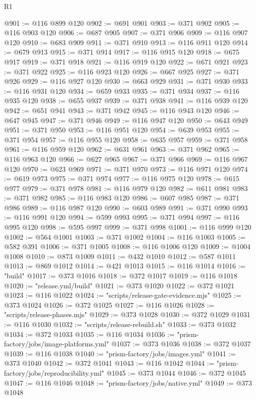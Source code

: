 \begin{lexlean}{R1}
\begin{coremodule}
@901 := @116 @899 @120
@902 := @691 @901
@903 := @371 @902
@905 := @116 @903 @120
@906 := @687 @905
@907 := @371 @906
@909 := @116 @907 @120
@910 := @683 @909
@911 := @371 @910
@913 := @116 @911 @120
@914 := @679 @913
@915 := @371 @914
@917 := @116 @915 @120
@918 := @675 @917
@919 := @371 @918
@921 := @116 @919 @120
@922 := @671 @921
@923 := @371 @922
@925 := @116 @923 @120
@926 := @667 @925
@927 := @371 @926
@929 := @116 @927 @120
@930 := @663 @929
@931 := @371 @930
@933 := @116 @931 @120
@934 := @659 @933
@935 := @371 @934
@937 := @116 @935 @120
@938 := @655 @937
@939 := @371 @938
@941 := @116 @939 @120
@942 := @651 @941
@943 := @371 @942
@945 := @116 @943 @120
@946 := @647 @945
@947 := @371 @946
@949 := @116 @947 @120
@950 := @643 @949
@951 := @371 @950
@953 := @116 @951 @120
@954 := @639 @953
@955 := @371 @954
@957 := @116 @955 @120
@958 := @635 @957
@959 := @371 @958
@961 := @116 @959 @120
@962 := @631 @961
@963 := @371 @962
@965 := @116 @963 @120
@966 := @627 @965
@967 := @371 @966
@969 := @116 @967 @120
@970 := @623 @969
@971 := @371 @970
@973 := @116 @971 @120
@974 := @619 @973
@975 := @371 @974
@977 := @116 @975 @120
@978 := @615 @977
@979 := @371 @978
@981 := @116 @979 @120
@982 := @611 @981
@983 := @371 @982
@985 := @116 @983 @120
@986 := @607 @985
@987 := @371 @986
@989 := @116 @987 @120
@990 := @603 @989
@991 := @371 @990
@993 := @116 @991 @120
@994 := @599 @993
@995 := @371 @994
@997 := @116 @995 @120
@998 := @595 @997
@999 := @371 @998
@1001 := @116 @999 @120
@1002 := @564 @1001
@1003 := @371 @1002
@1004 := @116 @1003
@1005 := @582 @391
@1006 := @371 @1005
@1008 := @116 @1006 @120
@1009 := @1004 @1008
@1010 := @873 @1009
@1011 := @432 @1010
@1012 := @587 @1011
@1013 := @869 @1012
@1014 := @421 @1013
@1015 := @116 @1014
@1016 := "build"
@1017 := @373 @1016
@1018 := @372 @1017
@1019 := @116 @1018
@1020 := "release.yml/build"
@1021 := @373 @1020
@1022 := @372 @1021
@1023 := @116 @1022
@1024 := "scripts/release-gate-evidence.mjs"
@1025 := @373 @1024
@1026 := @372 @1025
@1027 := @116 @1026
@1028 := "scripts/release-phases.mjs"
@1029 := @373 @1028
@1030 := @372 @1029
@1031 := @116 @1030
@1032 := "scripts/release-rebuild.sh"
@1033 := @373 @1032
@1034 := @372 @1033
@1035 := @116 @1034
@1036 := "prism-factory/jobs/image-platforms.yml"
@1037 := @373 @1036
@1038 := @372 @1037
@1039 := @116 @1038
@1040 := "prism-factory/jobs/images.yml"
@1041 := @373 @1040
@1042 := @372 @1041
@1043 := @116 @1042
@1044 := "prism-factory/jobs/reproducibility.yml"
@1045 := @373 @1044
@1046 := @372 @1045
@1047 := @116 @1046
@1048 := "prism-factory/jobs/native.yml"
@1049 := @373 @1048

\end{coremodule}
\end{lexlean}
